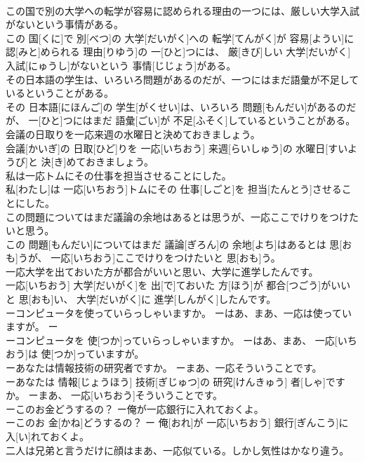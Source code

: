 \documentclass[8pt]{extreport}
\begin{document}
\begin{CJK}{UTF8}{min}
\\	この国で別の大学への転学が容易に認められる理由の一つには、厳しい大学入試がないという事情がある。	
\\	この 国[くに]で 別[べつ]の 大学[だいがく]への 転学[てんがく]が 容易[ようい]に 認[みと]められる 理由[りゆう]の 一[ひと]つには、 厳[きび]しい 大学[だいがく] 入試[にゅうし]がないという 事情[じじょう]がある。
\\	その日本語の学生は、いろいろ問題があるのだが、一つにはまだ語彙が不足しているということがある。	
\\	その 日本語[にほんご]の 学生[がくせい]は、いろいろ 問題[もんだい]があるのだが、 一[ひと]つにはまだ 語彙[ごい]が 不足[ふそく]しているということがある。
\\	会議の日取りを一応来週の水曜日と決めておきましょう。	
\\	会議[かいぎ]の 日取[ひど]りを 一応[いちおう] 来週[らいしゅう]の 水曜日[すいようび]と 決[き]めておきましょう。
\\	私は一応トムにその仕事を担当させることにした。	
\\	私[わたし]は 一応[いちおう]トムにその 仕事[しごと]を 担当[たんとう]させることにした。
\\	この問題についてはまだ議論の余地はあるとは思うが、一応ここでけりをつけたいと思う。	
\\	この 問題[もんだい]についてはまだ 議論[ぎろん]の 余地[よち]はあるとは 思[おも]うが、 一応[いちおう]ここでけりをつけたいと 思[おも]う。
\\	一応大学を出ておいた方が都合がいいと思い、大学に進学したんです。	
\\	一応[いちおう] 大学[だいがく]を 出[で]ておいた 方[ほう]が 都合[つごう]がいいと 思[おも]い、 大学[だいがく]に 進学[しんがく]したんです。
\\	ーコンピュータを使っていらっしゃいますか。 ーはあ、まあ、一応は使っていますが。	ー
\\	ーコンピュータを 使[つか]っていらっしゃいますか。 ーはあ、まあ、 一応[いちおう]は 使[つか]っていますが。
\\	ーあなたは情報技術の研究者ですか。 ーまあ、一応そういうことです。	
\\	ーあなたは 情報[じょうほう] 技術[ぎじゅつ]の 研究[けんきゅう] 者[しゃ]ですか。 ーまあ、 一応[いちおう]そういうことです。
\\	ーこのお金どうするの？ ー俺が一応銀行に入れておくよ。	
\\	ーこのお 金[かね]どうするの？ ー 俺[おれ]が 一応[いちおう] 銀行[ぎんこう]に 入[い]れておくよ。
\\	二人は兄弟と言うだけに顔はまあ、一応似ている。しかし気性はかなり違う。	

\end{CJK}
\end{document}
